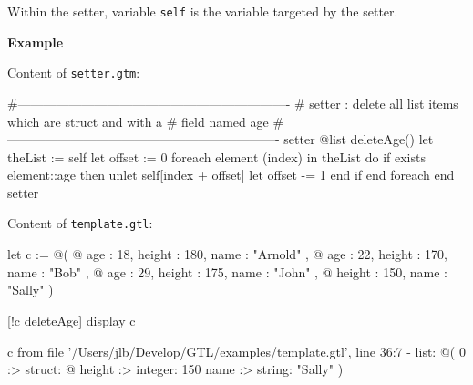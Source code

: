 \documentclass[10pt,openright,twosides]{report}
\newcommand{\gtlinline}[1]{\colorbox{light-blue}{\lstinline[language=gtl]{#1}}}
\newcommand{\example}{\vspace{.75em}\noindent\textbf{Example}\vspace{0em}}
\begin{document}
Within the setter, variable \gtlinline{self} is the variable targeted by the setter.

\example

\noindent Content of \texttt{\footnotesize setter.gtm}:
\begin{gtl}
#----------------------------------------------------------------
# setter : delete all list items which are struct and with a
# field named age
#----------------------------------------------------------------
setter @list deleteAge()
  let theList := self
  let offset := 0
  foreach element (index) in theList do
    if exists element::age then
      unlet self[index + offset]
      let offset -= 1
    end if
  end foreach
end setter
\end{gtl}

\noindent Content of \texttt{\footnotesize template.gtl}:
\begin{gtl}
let c := @(
  @{ age : 18, height : 180, name : "Arnold" },
  @{ age : 22, height : 170, name : "Bob"    },
  @{ age : 29, height : 175, name : "John"   },
  @{           height : 150, name : "Sally"  }
)

[!c deleteAge]
display c
\end{gtl}
\begin{console}
c from file '/Users/jlb/Develop/GTL/examples/template.gtl', line 36:7
  - list: @(
    0 :>
        struct: @{
            height :>
                integer: 150
            name :>
                string: "Sally"
        }
)
\end{console}
\end{document}
